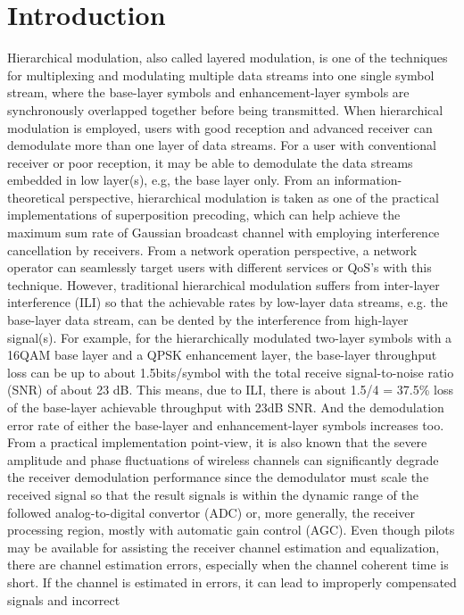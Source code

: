 \documentclass[conference]{IEEEtran}
\begin{document}
\section{Introduction}
Hierarchical modulation, also called layered modulation, is one of
the techniques for multiplexing and modulating multiple data
streams into one single symbol stream, where the base-layer
symbols and enhancement-layer symbols are synchronously overlapped
together before being transmitted. When hierarchical modulation is
employed, users with good reception and advanced receiver can
demodulate more than one layer of data streams. For a user with
conventional receiver or poor reception, it may be able to
demodulate the data streams embedded in low layer(s), e.g, the
base layer only. From an information-theoretical perspective,
hierarchical modulation is taken as one of the practical
implementations of superposition precoding, which can help achieve
the maximum sum rate of Gaussian broadcast channel with employing
interference cancellation by receivers. From a network operation
perspective, a network operator can seamlessly target users with
different services or QoS's with this technique. However,
traditional hierarchical modulation suffers from inter-layer
interference (ILI) so that the achievable rates by low-layer data
streams, e.g. the base-layer data stream, can be dented by the
interference from high-layer signal(s). For example, for the
hierarchically modulated two-layer symbols with a 16QAM base layer
and a QPSK enhancement layer, the base-layer throughput loss can
be up to about 1.5bits/symbol with the total receive
signal-to-noise ratio (SNR) of about 23 dB. This means, due to
ILI, there is about 1.5/4 = 37.5\% loss of the base-layer
achievable throughput with 23dB SNR. And the demodulation error
rate of either the base-layer and enhancement-layer symbols
increases too. From a practical implementation point-view, it is
also known that the severe amplitude and phase fluctuations of
wireless channels can significantly degrade the receiver
demodulation performance since the demodulator must scale the
received signal so that the result signals is within the dynamic
range of the followed analog-to-digital convertor (ADC) or, more
generally, the receiver processing region, mostly with automatic
gain control (AGC). Even though pilots may be available for
assisting the receiver channel estimation and equalization, there
are channel estimation errors, especially when the channel
coherent time is short. If the channel is estimated in errors, it
can lead to improperly compensated signals and incorrect
\end{document}
